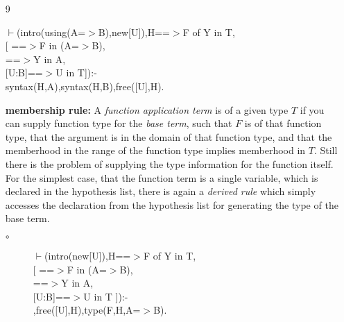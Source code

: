 \documentclass[11pt]{report}
\begin{document}
\begin{enumerate}
 \item[9]
\begin{sf}\begin{tabbing}
$\vdash$(intro(using(A=$>$B),new[U]),H==$>$F of Y in T, \\[-0.15ex]
\hspace{2em}[ ==$>$F in (A=$>$B), \\[-0.15ex]
\hspace{3em}==$>$Y in A, \\[-0.15ex]
\hspace{3em}[U:B]==$>$U in T]):-\\[-0.15ex]
\hspace{2em}syntax(H,A),syntax(H,B),free([U],H).
\end{tabbing}\end{sf}

 {\bf membership rule:}
 A \emph{function application term} is of a given type $T$ if you can
 supply function type for the \emph{base term}, such that $F$ is
 of that function type, that the argument is in the domain
 of that function type, and that the memberhood in the range of
 the function type implies memberhood in $T$.
 Still there is the problem of
 supplying the type information for the function itself. For the
 simplest case, that the function term is a single variable, which
 is declared in the hypothesis list, there is again a \emph{derived 
 rule} which simply accesses the declaration from the hypothesis
 list for generating the type of the base term.
  
 \begin{description}
 \item[$\circ$]
\begin{sf}\begin{tabbing}
$\vdash$(intro(new[U]),H==$>$F of Y in T, \\[-0.15ex]
\hspace{2em}[ ==$>$F in (A=$>$B), \\[-0.15ex]
\hspace{3em}==$>$Y in A,\\[-0.15ex]
\hspace{3em}[U:B]==$>$U in T ]):-\\[-0.15ex]
\hspace{2em}{\bf derived},free([U],H),type(F,H,A=$>$B).
\end{tabbing}\end{sf}

 \end{description}
  

\end{enumerate}
\end{document}
